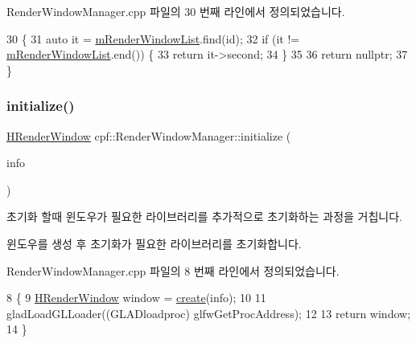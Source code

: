 Render\+Window\+Manager.\+cpp 파일의 30 번째 라인에서 정의되었습니다.


\begin{DoxyCode}
30                                                                          \{
31         \textcolor{keyword}{auto} it = \hyperlink{classcpf_1_1_render_window_manager_a06f8628fd71091311dd2cbb908f744a2}{mRenderWindowList}.find(\textcolor{keywordtype}{id});
32         \textcolor{keywordflow}{if} (it != \hyperlink{classcpf_1_1_render_window_manager_a06f8628fd71091311dd2cbb908f744a2}{mRenderWindowList}.end()) \{
33             \textcolor{keywordflow}{return} it->second;
34         \}
35 
36         \textcolor{keywordflow}{return} \textcolor{keyword}{nullptr};
37     \}
\end{DoxyCode}
\mbox{\label{classcpf_1_1_render_window_manager_a9e198c25b9f2eb5dd5b248e47532677d}} 
\subsubsection{\texorpdfstring{initialize()}{initialize()}}
{\footnotesize\ttfamily \hyperlink{namespacecpf_af5ffcc39bb6465427fc3b91366c917f6}{H\+Render\+Window} cpf\+::\+Render\+Window\+Manager\+::initialize (\begin{DoxyParamCaption}\item[{const \hyperlink{structcpf_1_1_render_window_create_info}{Render\+Window\+Create\+Info} \&}]{info }\end{DoxyParamCaption})}



초기화 할때 윈도우가 필요한 라이브러리를 추가적으로 초기화하는 과정을 거칩니다. 

윈도우를 생성 후 초기화가 필요한 라이브러리를 초기화합니다. 

Render\+Window\+Manager.\+cpp 파일의 8 번째 라인에서 정의되었습니다.


\begin{DoxyCode}
8                                                                                     \{
9         \hyperlink{namespacecpf_af5ffcc39bb6465427fc3b91366c917f6}{HRenderWindow} window = \hyperlink{classcpf_1_1_render_window_manager_a9fa02758ec62cd361e8abd2c03b7cc17}{create}(info);
10 
11         gladLoadGLLoader((GLADloadproc) glfwGetProcAddress);
12 
13         \textcolor{keywordflow}{return} window;
14     \}
\end{DoxyCode}
\mbox{\label{classcpf_1_1_t_module_ac8065254584cb0a6656c42f96859d190}} 
